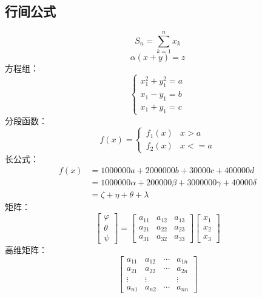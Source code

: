 \documentclass[a4paper,AutoFakeBold={2.7}]{ctexart} %
\begin{document}
\subsection{行间公式}
\begin{equation}
	S_{n}=\sum_{k=1}^{n} x_{k} \label{(1)}
\end{equation}
\begin{equation}
	\alpha\left( x+y\right) =z
\end{equation}
方程组：
\begin{equation}
	\begin{cases}
		x_{1}^{2}+y_{1}^2=a\\
		x_{1}-y_{1}=b\\
		x_{1}+y_{1}=c
	\end{cases}
\end{equation}
分段函数：
\begin{equation}
	f(x)=
	\begin{cases}
		f_{1}(x) &x>a\\
		f_{2}(x) &x<=a
	\end{cases}
\end{equation}
长公式：
\begin{equation}
	\begin{split}
		f(x)&=1000000a+2000000b+30000c+400000d\\
		&=1000000\alpha+200000\beta+3000000\gamma+40000\delta\\
		&=\zeta+\eta+\theta+\lambda
	\end{split}
\end{equation}
矩阵：
\begin{equation}
	\left[ 
	\begin{array}{c}
		\varphi\\
		\theta\\
		\psi
	\end{array}\right] =
	\left[
	\begin{array}{ccc}
		a_{11}&a_{12}&a_{13}\\
		a_{21}&a_{22}&a_{23}\\
		a_{31}&a_{32}&a_{33}
	\end{array}\right] 
	\left[\begin{array}{c}
		x_{1}\\
		x_{2}\\
		x_{3} 
	\end{array}\right] 
\end{equation}
高维矩阵：
\begin{equation}
	\left[ \begin{array}{cccc}
		a_{11}&a_{12}&\cdots&a_{1n}\\
		a_{21}&a_{22}&\cdots&a_{2n}\\
		\vdots&\vdots&{}&\vdots\\
		a_{n1}&a_{n2}&\cdots&a_{nn}
	\end{array}\right] 
\end{equation}
\end{document}
